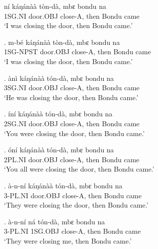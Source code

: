 \documentclass{assets/fieldnotes}
\begin{document}
ní       káŋánàà    tòn-dà,    mbɛ    bondu   na   \\
1SG.NI   door.OBJ   close-A,   then   Bondu   came \\%
`I was closing the door, then Bondu came.'

\exg.
m-bé        káŋánàà    tòn-dà,    mbɛ    bondu   na   \\
1SG-NPST   door.OBJ   close-A,   then   Bondu   came \\%
`I was closing the door, then Bondu came.'

\exg.
ànì      káŋánàà    tón-dà,    mbɛ    bondu   na   \\
3SG.NI   door.OBJ   close-A,   then   Bondu   came \\%
`He was closing the door, then Bondu came.' \label{22883}

\exg.
íní      káŋánàà    tón-dà,    mbɛ    bondu   na   \\
2SG.NI   door.OBJ   close-A,   then   Bondu   came \\%
`You were closing the door, then Bondu came.'

\exg.
óní      káŋánàà    tón-dà,    mbɛ    bondu   na   \\
2PL.NI   door.OBJ   close-A,   then   Bondu   came \\%
`You all were closing the door, then Bondu came.'

\exg.
à-n-ní     káŋánàà    tón-dà,    mbɛ    bondu   na   \\
3-PL.NI   door.OBJ   close-A,   then   Bondu   came \\%
`They were closing the door, then Bondu came.' \label{60205}


\exg.
à-n-ní     ná        tón-dà,    mbɛ    bondu   na   \\
3-PL.NI   1SG.OBJ   close-A,   then   Bondu   came \\%
`They were closing me, then Bondu came.'
\end{document}
